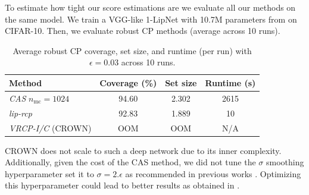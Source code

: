 To estimate how tight our score estimations are we evaluate all our methods on the same model. We train a VGG-like 1-LipNet with 10.7M parameters from \citet{boissin2025adaptiveorthogonalconvolutionscheme} on CIFAR-10. Then, we evaluate robust CP methods (average across 10 runs).

\begin{table}[h!]
  \centering
  \begin{tabular}{
    l
    S[table-format=2.2]
    S[table-format=1.3]
    S[table-format=4.0]
  }
    \toprule
    \textbf{Method}                & {\textbf{Coverage (\%)}} & {\textbf{Set size}} & {\textbf{Runtime (s)}} \\
    \midrule
    \emph{CAS} \(n_{\mathrm{mc}}=1024\)   & 94.60                    & 2.302               & 2615                  \\
    \emph{lip-rcp}                        & 92.83                    & 1.889               &   10                  \\
    \emph{VRCP-I/C} (CROWN)               & {OOM}                    & {OOM}               & {N/A}                 \\
    \bottomrule
  \end{tabular}
  \caption{Average robust CP coverage, set size, and runtime (per run) with \(\epsilon=0.03\) across 10 runs.}
  \label{tab:robust_cp_performance}
\end{table}

CROWN does not scale to such a deep network due to its inner complexity. Additionally, given the cost of the CAS method, we did not tune the $\sigma$ smoothing hyperparameter set it to $\sigma = 2.\epsilon$ as recommended in previous works \cite{rscp_plus}. Optimizing this hyperparameter could lead to better results as obtained in \cite{bincp}.
